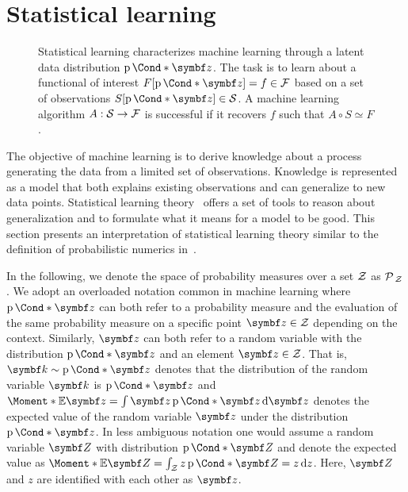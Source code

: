 \section{Statistical learning}
\label{toc:bayesian_ml:statistical_learning}
\begin{figure}[t]
    \centering
    \caption[Statistical learning]{
        \label{fig:bayesian_ml:statistical_learning}
        Statistical learning characterizes machine learning through a latent data distribution $\Prob*{\mat{z}}$.
        The task is to learn about a functional of interest $F[\Prob*{\mat{z}}] = f \in \Fc$ based on a set of observations $S[\Prob*{\mat{z}}] \in \Sc$.
        A machine learning algorithm $A : \mathcal{S} \to \mathcal{F}$ is successful if it recovers $f$ such that $A \circ S \simeq F$.
    }
\end{figure}
The objective of machine learning is to derive knowledge about a process generating the data from a limited set of observations.
Knowledge is represented as a model that both explains existing observations and can generalize to new data points.
Statistical learning theory~\parencite{gareth_james_introduction_2013,trevor_hastie_elements_2013} offers a set of tools to reason about generalization and to formulate what it means for a model to be good.
This section presents an interpretation of statistical learning theory similar to the definition of probabilistic numerics in~\parencite{oates_modern_2019,cockayne_bayesian_2019}.

In the following, we denote the space of probability measures over a set $\mathcal{Z}$ as $\operatorname{\mathcal{P}\mkern2mu}_{\mathcal{Z}}$.
We adopt an overloaded notation common in machine learning where $\Prob*{\mat{z}}$ can both refer to a probability measure and the evaluation of the same probability measure on a specific point $\mat{z} \in \Zc$ depending on the context.
Similarly, $\mat{z}$ can both refer to a random variable with the distribution $\Prob*{\mat{z}}$ and an element $\mat{z} \in \Zc$.
That is, $\mat{k} \sim \Prob*{\mat{z}}$ denotes that the distribution of the random variable $\mat{k}$ is $\Prob*{\mat{z}}$ and $\Moment*{\E}{\mat{z}} = \int \mat{z} \Prob*{\mat{z}} \diff \mat{z}$ denotes the expected value of the random variable $\mat{z}$ under the distribution $\Prob*{\mat{z}}$.
In less ambiguous notation one would assume a random variable $\mat{Z}$ with distribution $\Prob*{\mat{Z}}$ and denote the expected value as $\Moment*{\E}{\mat{Z}} = \int_{\Zc} z \Prob*{\mat{Z} = z} \diff z$.
Here, $\mat{Z}$ and $z$ are identified with each other as $\mat{z}$.

